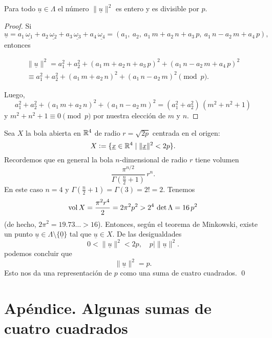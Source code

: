 \documentclass{article}
\numberwithin{equation}{section}
\begin{document}
\begin{observacion}
  Para todo $\underline{u}\in \Lambda$ el número $\|\underline{u}\|^2$ es entero
  y es divisible por $p$.

  \begin{proof}
    Si
    $$\underline{u} = a_1\,\underline{\omega_1} + a_2\,\underline{\omega_2} + a_3\,\underline{\omega_3} + a_4\,\underline{\omega_4} = (a_1, ~ a_2, ~ a_1\,m+a_2\,n + a_3\,p, ~ a_1\,n-a_2\,m + a_4\,p),$$
    entonces

    \begin{multline*}
      \|\underline{u}\|^2 = a_1^2 + a_2^2 + (a_1\,m+a_2\,n + a_3\,p)^2 + (a_1\,n-a_2\,m + a_4\,p)^2 \\
      \equiv a_1^2 + a_2^2 + (a_1\,m+a_2\,n)^2 + (a_1\,n-a_2\,m)^2 \pmod{p}.
    \end{multline*}

    Luego,
    $$a_1^2 + a_2^2 + (a_1\,m+a_2\,n)^2 + (a_1\,n-a_2\,m)^2 = (a_1^2 + a_2^2)\,(m^2 + n^2 + 1)$$
    y $m^2 + n^2 + 1 \equiv 0 \pmod{p}$ por nuestra elección de $m$ y $n$.
  \end{proof}
\end{observacion}

Sea $X$ la bola abierta en $\mathbb{R}^4$ de radio $r = \sqrt{2p}$ centrada en el
origen:
$$X \mathrel{\mathop:}= \{ \underline{x} \in \mathbb{R}^4 \mid \|\underline{x}\|^2 < 2p \}.$$
Recordemos que en general la bola $n$-dimensional de radio $r$ tiene volumen
$$\frac{\pi^{n/2}}{\Gamma \left(\frac{n}{2}+1\right)}\,r^n.$$
En este caso $n = 4$ y
$\Gamma \left(\frac{n}{2}+1\right) = \Gamma (3) = 2! = 2$. Tenemos
$$\operatorname{vol} X = \frac{\pi^2 r^4}{2} = 2 \pi^2 p^2 > 2^4\,\det \Lambda = 16\,p^2$$
(de hecho, $2 \pi^2 = 19.73\ldots > 16$). Entonces, según el teorema de
Minkowski, existe un punto
$\underline{u}\in \Lambda \setminus \{ \underline{0} \}$ tal que
$\underline{u} \in X$. De las desigualdades
$$0 < \|\underline{u}\|^2 < 2p, \quad p \mid \|\underline{u}\|^2.$$
podemos concluir que
$$\|\underline{u}\|^2 = p.$$
Esto nos da una representación de $p$ como una suma de cuatro cuadrados. \qed


\newpage

\section*{Apéndice. Algunas sumas de cuatro cuadrados}

\small
\end{document}

